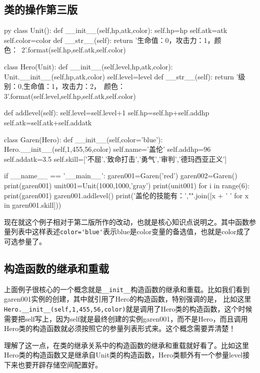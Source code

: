\documentclass[12pt,oneside]{book}
\begin{document}
\begin{common-format}
\section{类的操作第三版}
\label{sec:类的操作第三版}
\begin{xverbatim}[129]{py}
class Unit():
    def __init__(self,hp,atk,color):
        self.hp=hp
        self.atk=atk
        self.color=color
    def __str__(self):
        return '生命值：{0}，攻击力：{1}，颜色：\
        {2}'.format(self.hp,self.atk,self.color)

class Hero(Unit):
    def __init__(self,level,hp,atk,color):
        Unit.__init__(self,hp,atk,color)
        self.level=level
    def __str__(self):
        return '级别：{0},生命值：{1}，攻击力：{2}，\
        颜色：{3}'.format(self.level,self.hp,self.atk,self.color)

    def addlevel(self):
        self.level=self.level+1
        self.hp=self.hp+self.addhp
        self.atk=self.atk+self.addatk

class Garen(Hero):
    def __init__(self,color='blue'):
        Hero.__init__(self,1,455,56,color)
        self.name='盖伦'
        self.addhp=96
        self.addatk=3.5
        self.skill=['不屈','致命打击','勇气','审判','德玛西亚正义']

if __name__ == '__main__':
    garen001=Garen('red')
    garen002=Garen()
    print(garen001)
    unit001=Unit(1000,1000,'gray')
    print(unit001)
    for i in range(6):
        print(garen001)
        garen001.addlevel()
    print('盖伦的技能有：',"".join([x + '  ' for x in garen001.skill]))
\end{xverbatim}
现在就这个例子相对于第二版所作的改动，也就是核心知识点说明之。其中函数参量列表中这样表述\verb+color='blue'+表示blue是color变量的备选值，也就是color成了可选参量了。


\subsection{构造函数的继承和重载}
上面例子很核心的一个概念就是\verb+__init__+构造函数的继承和重载。比如我们看到garen001实例的创建，其中就引用了Hero的构造函数，特别强调的是， 比如这里\\
\verb+Hero.__init__(self,1,455,56,color)+就是调用了Hero类的构造函数，这个时候需要把self写上，因为self就是最终创建的实例garen001，而不是Hero，而且调用Hero类的构造函数就必须按照它的参量列表形式来。这个概念需要弄清楚！

理解了这一点，在类的继承关系中的构造函数的继承和重载就好看了。比如这里Hero类的构造函数又是继承自Unit类的构造函数，Hero类额外有一个参量level接下来也要开辟存储空间配置好。


\end{common-format}
\end{document}
